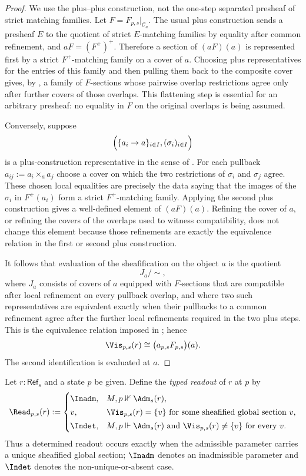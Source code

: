 \begin{proof}
We use the plus--plus construction, not the one-step separated
presheaf of strict matching families. Let $F=F_{p,s}|_{\mathcal C_a}$.
The usual plus construction sends a presheaf $E$ to the quotient of
strict $E$-matching families by equality after common refinement, and
$aF=(F^+)^+$. Therefore a section of $(aF)(a)$ is represented first by a
strict $F^+$-matching family on a cover of $a$. Choosing plus
representatives for the entries of this family and then pulling them back
to the composite cover gives, by
, a family of
$F$-sections whose pairwise overlap restrictions agree only after further
covers of those overlaps. This flattening step is essential for an
arbitrary presheaf: no equality in $F$ on the original overlaps is being
assumed.

Conversely, suppose
\[
\Bigl(\{a_i\to a\}_{i\in I},(\sigma_i)_{i\in I}\Bigr)
\]
is a plus-construction representative in the sense of
. For each pullback
$a_{ij}:=a_i\times_a a_j$ choose a cover on which the two restrictions of
$\sigma_i$ and $\sigma_j$ agree. These chosen local equalities are
precisely the data saying that the images of the $\sigma_i$ in
$F^+(a_i)$ form a strict $F^+$-matching family. Applying the second plus
construction gives a well-defined element of $(aF)(a)$. Refining the
cover of $a$, or refining the covers of the overlaps used to witness
compatibility, does not change this element because those refinements are
exactly the equivalence relation in the first or second plus construction.

It follows that evaluation of the sheafification on the object $a$ is the
quotient
\[
J_a/\!\sim,
\]
where $J_a$ consists of covers of $a$ equipped with $F$-sections that are
compatible after local refinement on every pullback overlap, and where
two such representatives are equivalent exactly when their pullbacks to a
common refinement agree after the further local refinements required in
the two plus steps. This is the equivalence relation imposed in
; hence
\[
\Vis_{p,s}(r)\cong \bigl(a_{p,s}F_{p,s}\bigr)(a).
\]
The second identification is  evaluated at $a$.
\end{proof}


\begin{definition}\label{def:typed-readout}
Let $r:\mathsf{Ref}_s$ and a state $p$ be given. Define the \emph{typed readout} of $r$ at $p$ by
\[
\Read_{p,s}(r):=
\begin{cases}
\Inadm, & M,p\nVdash \Adm_s(r),\\[0.5ex]
v, & \Vis_{p,s}(r)=\{v\}\ \text{for some sheafified global section }v,\\[0.5ex]
\Indet, & M,p\Vdash \Adm_s(r)\ \text{and}\ \Vis_{p,s}(r)\neq\{v\}\ \text{for every }v.
\end{cases}
\]
Thus a determined readout occurs exactly when the admissible parameter carries a unique sheafified global section; $\Inadm$ denotes an inadmissible parameter and $\Indet$ denotes the non-unique-or-absent case.
\end{definition}

